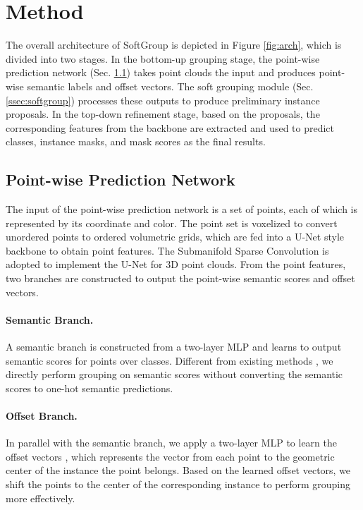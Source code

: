 \documentclass[10pt,twocolumn,letterpaper]{article}
\begin{document}
	\section{Method}
	
	
	The overall architecture of SoftGroup is depicted in Figure \ref{fig:arch}, which is divided into two stages. In the bottom-up grouping stage, the point-wise prediction network (Sec. \ref{ssec:point_wise_net}) takes point clouds the input and produces point-wise semantic labels and offset vectors. The soft grouping module (Sec. \ref{ssec:softgroup}) processes these outputs to produce preliminary instance proposals. In the top-down refinement stage, based on the proposals, the corresponding features from the backbone are extracted and used to predict classes, instance masks, and mask scores as the final results.
	
	\subsection{Point-wise Prediction Network}
	\label{ssec:point_wise_net}
	The input of the point-wise prediction network is a set of  points, each of which is represented by its coordinate and color. The point set is voxelized to convert unordered points to ordered volumetric grids, which are fed into a U-Net style backbone \cite{ronneberger2015u} to obtain point features. The Submanifold Sparse Convolution \cite{graham20183d} is adopted to implement the U-Net for 3D point clouds. From the point features, two branches are constructed to output the point-wise semantic scores and offset vectors.
	
	\paragraph{Semantic Branch.} A semantic branch is constructed from a two-layer MLP and learns to output semantic scores  for  points over  classes. Different from existing methods \cite{jiang2020pointgroup,chen2021hierarchical}, we directly perform grouping on semantic scores without converting the semantic scores to one-hot semantic predictions. 
	
	\paragraph{Offset Branch.} In parallel with the semantic branch, we apply a two-layer MLP to learn the offset vectors , which represents the vector from each point to the geometric center of the instance the point belongs. Based on the learned offset vectors, we shift the points to the center of the corresponding instance to perform grouping more effectively.
	
\end{document}
